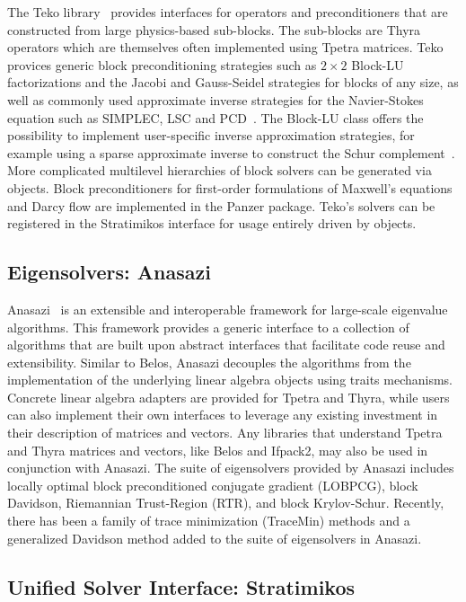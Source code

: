 The Teko library~\cite{Cyr2016a} provides interfaces for operators and preconditioners that are constructed from large physics-based sub-blocks.
The sub-blocks are Thyra operators which are themselves often implemented using Tpetra matrices.
Teko provices generic block preconditioning strategies such as $2\times2$ Block-LU factorizations and the Jacobi and Gauss-Seidel strategies for blocks of any size,
as well as commonly used approximate inverse strategies for the Navier-Stokes equation
such as SIMPLEC, LSC and PCD~\cite{CyrShadidEtAl2012_StabilizationScalableBlockPreconditioning}.
The Block-LU class offers the possibility to implement user-specific inverse approximation strategies,
for example using a sparse approximate inverse to construct the Schur complement~\cite{Firmbach2024a}.
More complicated multilevel hierarchies of block solvers can be generated via  objects.
Block preconditioners for first-order formulations of Maxwell's equations and Darcy flow are implemented in the Panzer package.
Teko's solvers can be registered in the Stratimikos interface for usage entirely driven by  objects.

\subsection{Eigensolvers: Anasazi}
Anasazi~\cite{Baker2009a} is an extensible and interoperable framework for large-scale eigenvalue algorithms.
This framework provides a generic interface to a collection of algorithms that are built upon abstract interfaces
that facilitate code reuse and extensibility.  Similar to Belos, Anasazi decouples the algorithms from the
implementation of the underlying linear algebra objects using traits mechanisms.  Concrete linear algebra adapters
are provided for Tpetra and Thyra, while users can also implement their own interfaces to leverage any existing
investment in their description of matrices and vectors.  Any libraries that understand Tpetra and Thyra matrices
and vectors, like Belos and Ifpack2, may also be used in conjunction with Anasazi.  The suite of eigensolvers provided
by Anasazi includes locally optimal block preconditioned conjugate gradient (LOBPCG), block Davidson, Riemannian Trust-Region
(RTR), and block Krylov-Schur.  Recently, there has been a family of trace minimization (TraceMin) methods and a
generalized Davidson method added to the suite of eigensolvers in Anasazi.


\subsection{Unified Solver Interface: Stratimikos}

